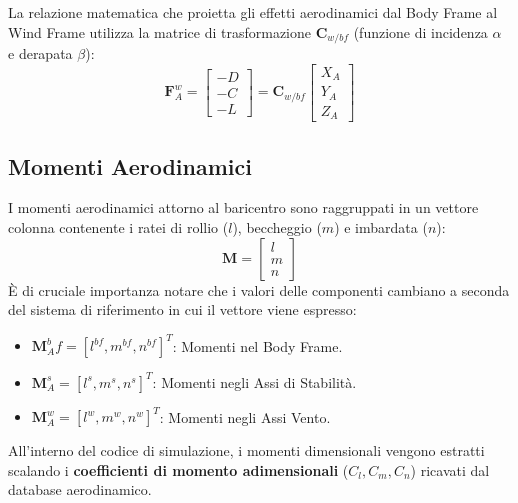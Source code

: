 La relazione matematica che proietta gli effetti aerodinamici dal Body Frame al Wind Frame utilizza la matrice di trasformazione $\mathbf{C}_{w/bf}$ (funzione di incidenza $\alpha$ e derapata $\beta$):
\begin{equation}
\mathbf{F}_A^w = \begin{bmatrix} -D \\ -C \\ -L \end{bmatrix} = \mathbf{C}_{w/bf} \begin{bmatrix} X_A \\ Y_A \\ Z_A \end{bmatrix}
\end{equation}

\subsection{Momenti Aerodinamici}
I momenti aerodinamici attorno al baricentro sono raggruppati in un vettore colonna contenente i ratei di rollio ($l$), beccheggio ($m$) e imbardata ($n$):
\begin{equation}
\mathbf{M} = \begin{bmatrix} l \\ m \\ n \end{bmatrix}
\end{equation}
È di cruciale importanza notare che i valori delle componenti cambiano a seconda del sistema di riferimento in cui il vettore viene espresso:
\begin{itemize}
    \item $\mathbf{M}_A^bf= [l^{bf}, m^{bf}, n^{bf}]^T$: Momenti nel Body Frame.
     \item $\mathbf{M}_A^s = [l^{s}, m^{s}, n^{s}]^T$: Momenti negli Assi di Stabilità.
     \item $\mathbf{M}_A^w = [l^{w}, m^{w}, n^{w}]^T$: Momenti negli Assi Vento.
\end{itemize}
All'interno del codice di simulazione, i momenti dimensionali vengono estratti scalando i \textbf{coefficienti di momento adimensionali} ($C_l, C_m, C_n$) ricavati dal database aerodinamico.


